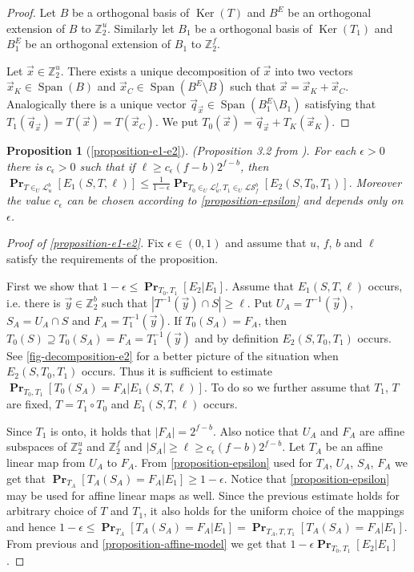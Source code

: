 \documentclass[unicode,review]{siamart1116}
\newcommand{\vecspace}[2]{\mathbb{Z}_{#1}^{#2}}
\newcommand{\binvecspace}[1]{\vecspace{2}{#1}}
\newcommand{\linearmaps}[2]{\mathcal{L}_{#1}^{#2}}
\newcommand{\surjectivelinearmaps}[2]{\mathcal{LS}_{#1}^{#2}}
\newcommand{\probs}[2]{\operatorname{\mathbf{Pr}}_{{#1}}\left[{#2}\right]}
\newtheorem*{propositionrep*}{Proposition}
\numberwithin{theorem}{section}
\begin{document}
\begin{appendix}
\begin{proof}
Let $B$ be a orthogonal basis of $\operatorname{Ker}(T)$ and $B^E$ be an orthogonal extension of $B$ to $\binvecspace{u}$.
Similarly let $B_1$ be a orthogonal basis of $\operatorname{Ker}(T_1)$ and $B_1^E$ be an orthogonal extension of $B_1$ to $\binvecspace{f}$.

Let $\vec{x} \in \binvecspace{u}$.
There exists a unique decomposition of $\vec{x}$ into two vectors $\vec{x}_K \in \operatorname{Span}(B)$ and $\vec{x}_C \in \operatorname{Span}(B^E \setminus B)$ such that $\vec{x} = \vec{x}_K + \vec{x}_C$.
Analogically there is a unique vector $\vec{q}_{\vec{x}} \in \operatorname{Span}(B_1^E \setminus B_1)$ satisfying that $T_1(\vec{q}_{\vec{x}}) = T(\vec{x}) = T(\vec{x}_C)$.
We put $T_0(\vec{x}) = \vec{q}_{\vec{x}} + T_K(\vec{x}_K)$.
\end{proof}

\begin{propositionrep*}[\cref{proposition-e1-e2}]\emph{(Proposition 3.2 from \cite{alonetal}).}
For each $\epsilon > 0$ there is $c_\epsilon > 0$ such that if $\ell \geq c_\epsilon (f - b)2^{f-b}$, then
$
\probs{T \in_U \linearmaps{u}{b}}{E_1(S, T, \ell)} \leq \frac{1}{1 - \epsilon}\probs{T_0 \in_U \linearmaps{u}{f}, T_1 \in_U \surjectivelinearmaps{f}{b}}{E_2(S, T_0, T_1)}.
$
Moreover the value $c_\epsilon$ can be chosen according to \cref{proposition-epsilon} and depends only on $\epsilon$.
\end{propositionrep*}
\begin{proof}[Proof of \cref{proposition-e1-e2}]
Fix $\epsilon \in (0, 1)$ and assume that $u$, $f$, $b$ and $\ell$ satisfy the requirements of the proposition.

First we show that $1 - \epsilon \leq \probs{T_0, T_1}{E_2 | E_1}$.
Assume that $E_1(S, T, \ell)$ occurs, i.e. there is $\vec{y} \in \binvecspace{b}$ such that $|T^{-1}(\vec{y}) \cap S| \geq \ell$.
Put $U_A = T^{-1}(\vec{y})$, $S_A = U_A \cap S$ and $F_A = T_1^{-1}(\vec{y})$.
If $T_0(S_A) = F_A$, then $T_0(S) \supseteq T_0(S_A) = F_A = T_1^{-1}(\vec{y})$ and by definition $E_2(S, T_0, T_1)$ occurs.
See \cref{fig-decomposition-e2} for a better picture of the situation when $E_2(S, T_0, T_1)$ occurs.
Thus it is sufficient to estimate $\probs{T_0, T_1}{T_0(S_A) = F_A | E_1(S, T, \ell)}$.
To do so we further assume that $T_1$, $T$ are fixed, $T = T_1 \circ T_0$ and $E_1(S, T, \ell)$ occurs.

Since $T_1$ is onto, it holds that $|F_A| = 2^{f-b}$.
Also notice that $U_A$ and $F_A$ are affine subspaces of $\binvecspace{u}$ and $\binvecspace{f}$ and $|S_A| \geq \ell \geq c_\epsilon (f - b)2^{f-b}$.
Let $T_A$ be an affine linear map from $U_A$ to $F_A$.
From \cref{proposition-epsilon} used for $T_A$, $U_A$, $S_A$, $F_A$ we get that $\probs{T_A}{T_A(S_A) = F_A | E_1} \geq 1 - \epsilon$.
Notice that \cref{proposition-epsilon} may be used for affine linear maps as well.
Since the previous estimate holds for arbitrary choice of $T$ and $T_1$, it also holds for the uniform choice of the mappings and hence $1 - \epsilon \leq \probs{T_A}{T_A(S_A) = F_A | E_1} = \probs{T_A, T, T_1}{T_A(S_A) = F_A | E_1}$.
From previous and \cref{proposition-affine-model} we get that $1 - \epsilon \probs{T_0, T_1}{E_2 | E_1}$.


\end{proof}
\end{appendix}
\end{document}
